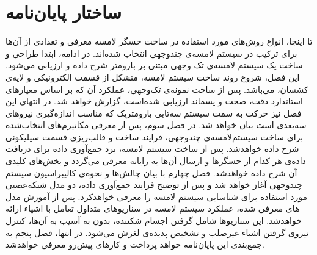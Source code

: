 \section{ساختار پایان‌نامه}
تا اینجا، انواع روش‌های مورد استفاده در ساخت حسگر لامسه معرفی و تعدادی از آن‌ها برای ترکیب در سیستم لامسه‌ی چند‌وجهی انتخاب شده‌اند. در ادامه، ابتدا طراحی و ساخت یک سیستم لامسه‌ی تک وجهی مبتنی بر بارومتر شرح داده و ارزیابی می‌شود. این فصل، شروع روند ساخت سیستم لامسه، متشکل از قسمت الکترونیکی و لایه‌ی کشسان، می‌باشد. پس از ساخت نمونه‌ی تک‌وجهی، عملکرد آن که بر اساس معیار‌های استاندارد دقت، صحت و پسماند ارزیابی شده‌است، گزارش خواهد شد. در انتهای این فصل نیز حرکت به سمت سیستم سه‌تایی بارومتریک که مناسب اندازه‌گیری نیروهای سه‌بعدی است بیان خواهد شد. در فصل سوم، پس از معرفی مکانیزم‌های انتخاب‌شده برای ساخت سیستم‌لامسه‌ی چند‌وجهی، فرایند ساخت و قالب‌ریزی قسمت سیلیکونی شرح داده خواهد‌شد. پس از ساخت سیستم لامسه، برد جمع‌آوری داده برای دریافت داد‌ه‌ی هر کدام از حسگرها و ارسال آن‌ها به رایانه معرفی می‌گردد و بخش‌های کلیدی آن شرح داده ‌خواهدشد. فصل چهارم با بیان چالش‌ها و نحوه‌ی کالیبراسیون سیستم چند‌وجهی آغاز خواهد شد و پس از توضیح فرایند جمع‌آوری داده، دو مدل‌ شبکه‌عصبی مورد استفاده برای شناسایی سیستم لامسه را معرفی خواهدکرد. پس از آموزش مدل های معرفی شده، عملکرد سیستم لامسه در سناریوهای متداول تعامل با اشیاء ارائه ‌خواهدشد. این سناریو‌ها شامل گرفتن اجسام شکننده، بدون به آسیب به آن‌ها، کنترل نیروی گرفتن اشیاء غیر‌صلب و تشخیص پدیده‌ی لغزش می‌شود. در انتها، فصل پنجم به جمع‌بندی این پایان‌نامه خواهد پرداخت و کارهای پیش‌رو معرفی خواهدشد.

